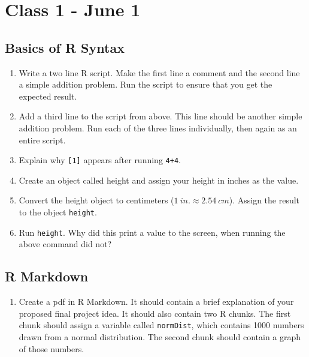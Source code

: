 \documentclass[letterpaper,12pt]{article}
\begin{document}
\section{Class 1 - June 1}

\subsection{Basics of R Syntax}

\begin{enumerate}
    \item Write a two line R script. 
    Make the first line a comment and the second line a simple addition problem. 
    Run the script to ensure that you get the expected result.
    \item Add a third line to the script from above. 
    This line should be another simple addition problem. 
    Run each of the three lines individually, then again as an entire script. 
    \item Explain why \verb|[1]| appears after running \verb|4+4|.
    \item Create an object called height and assign your height in inches as the value. 
    \item Convert the height object to centimeters ($1 \: in. \approx 2.54 \: cm$). 
    Assign the result to the object \verb|height|.
    \item Run \verb|height|. 
    Why did this print a value to the screen, when running the above command did not?
\end{enumerate}

\subsection{R Markdown}

\begin{enumerate}
    \item Create a pdf in R Markdown. 
    It should contain a brief explanation of your proposed final project idea. 
    It should also contain two R chunks. 
    The first chunk should assign a variable called \verb|normDist|, which contains 1000 numbers drawn from a normal distribution. 
    The second chunk should contain a graph of those numbers. 
\end{enumerate}
\end{document}
